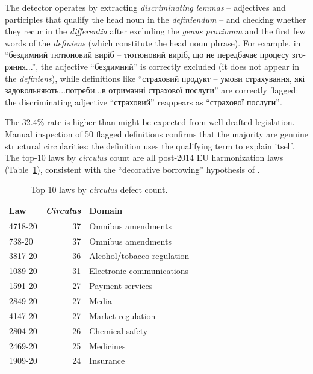 \documentclass[11pt]{article}
\begin{document}
The detector operates by extracting \emph{discriminating lemmas} -- adjectives and participles that qualify the head noun in the \emph{definiendum} -- and checking whether they recur in the \emph{differentia} after excluding the \emph{genus proximum} and the first few words of the \emph{definiens} (which constitute the head noun phrase).
For example, in \foreignlanguage{ukrainian}{``бездимний тютюновий виріб -- тютюновий виріб, що не передбачає процесу згоряння...''}, the adjective \foreignlanguage{ukrainian}{``бездимний''} is correctly excluded (it does not appear in the \emph{definiens}), while definitions like \foreignlanguage{ukrainian}{``страховий продукт -- умови страхування, які задовольняють...потреби...в отриманні страхової послуги''} are correctly flagged: the discriminating adjective \foreignlanguage{ukrainian}{``страховий''} reappears as \foreignlanguage{ukrainian}{``страхової послуги''}.

The 32.4\% rate is higher than might be expected from well-drafted legislation.
Manual inspection of 50 flagged definitions confirms that the majority are genuine structural circularities: the definition uses the qualifying term to explain itself.
The top-10 laws by \emph{circulus} count are all post-2014 EU harmonization laws (Table~\ref{tab:top-circulus}), consistent with the ``decorative borrowing'' hypothesis of \citet{kyrychenko2026creative}.

\begin{table}[t]
\centering
\caption{Top 10 laws by \emph{circulus} defect count.}
\label{tab:top-circulus}
\begin{tabular}{lrl}
\toprule
\textbf{Law} & \textbf{\emph{Circulus}} & \textbf{Domain} \\
\midrule
4718-20 & 37 & Omnibus amendments \\
738-20 & 37 & Omnibus amendments \\
3817-20 & 36 & Alcohol/tobacco regulation \\
1089-20 & 31 & Electronic communications \\
1591-20 & 27 & Payment services \\
2849-20 & 27 & Media \\
4147-20 & 27 & Market regulation \\
2804-20 & 26 & Chemical safety \\
2469-20 & 25 & Medicines \\
1909-20 & 24 & Insurance \\
\bottomrule
\end{tabular}
\end{table}
\end{document}
